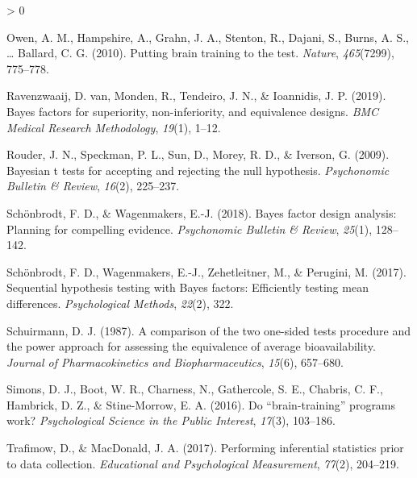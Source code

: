 \documentclass[
  english,
  man,floatsintext]{apa6}
\newlength{\cslhangindent}
\newenvironment{CSLReferences}[2] %
 {%
  \setlength{\parindent}{0pt}
  \ifodd #1 \everypar{\setlength{\hangindent}{\cslhangindent}}\ignorespaces\fi
  \ifnum #2 > 0
  \setlength{\parskip}{#2\baselineskip}
  \fi
 }%
 {}
\begin{document}
\begin{CSLReferences}{1}{0}
\leavevmode\hypertarget{ref-owen_putting_2010}{}%
Owen, A. M., Hampshire, A., Grahn, J. A., Stenton, R., Dajani, S., Burns, A. S., \ldots{} Ballard, C. G. (2010). Putting brain training to the test. \emph{Nature}, \emph{465}(7299), 775--778.

\leavevmode\hypertarget{ref-van_ravenzwaaij_bayes_2019}{}%
Ravenzwaaij, D. van, Monden, R., Tendeiro, J. N., \& Ioannidis, J. P. (2019). Bayes factors for superiority, non-inferiority, and equivalence designs. \emph{BMC Medical Research Methodology}, \emph{19}(1), 1--12.

\leavevmode\hypertarget{ref-rouder_bayesian_2009}{}%
Rouder, J. N., Speckman, P. L., Sun, D., Morey, R. D., \& Iverson, G. (2009). Bayesian t tests for accepting and rejecting the null hypothesis. \emph{Psychonomic Bulletin \& Review}, \emph{16}(2), 225--237.

\leavevmode\hypertarget{ref-schonbrodt_bayes_2018}{}%
Schönbrodt, F. D., \& Wagenmakers, E.-J. (2018). Bayes factor design analysis: {Planning} for compelling evidence. \emph{Psychonomic Bulletin \& Review}, \emph{25}(1), 128--142.

\leavevmode\hypertarget{ref-schonbrodt_sequential_2017}{}%
Schönbrodt, F. D., Wagenmakers, E.-J., Zehetleitner, M., \& Perugini, M. (2017). Sequential hypothesis testing with {Bayes} factors: {Efficiently} testing mean differences. \emph{Psychological Methods}, \emph{22}(2), 322.

\leavevmode\hypertarget{ref-schuirmann_comparison_1987}{}%
Schuirmann, D. J. (1987). A comparison of the two one-sided tests procedure and the power approach for assessing the equivalence of average bioavailability. \emph{Journal of Pharmacokinetics and Biopharmaceutics}, \emph{15}(6), 657--680.

\leavevmode\hypertarget{ref-simons_brain-training_2016}{}%
Simons, D. J., Boot, W. R., Charness, N., Gathercole, S. E., Chabris, C. F., Hambrick, D. Z., \& Stine-Morrow, E. A. (2016). Do {``brain-training''} programs work? \emph{Psychological Science in the Public Interest}, \emph{17}(3), 103--186.

\leavevmode\hypertarget{ref-trafimow_performing_2017}{}%
Trafimow, D., \& MacDonald, J. A. (2017). Performing inferential statistics prior to data collection. \emph{Educational and Psychological Measurement}, \emph{77}(2), 204--219.

\end{CSLReferences}

\endgroup
\end{document}
